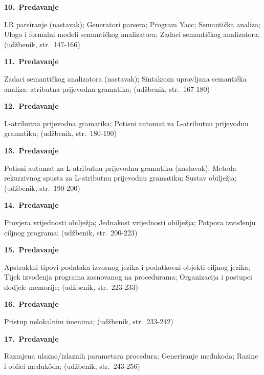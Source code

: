 \documentclass[times, 12pt, utf8]{book}
\newenvironment{myindentpar}[1]%
{\begin{list}{}%
         {\setlength{\leftmargin}{#1}}%
         \item[]%
}
{\end{list}}
\begin{document}
\textbf{10.~Predavanje}
\begin{myindentpar}{30pt}
LR parsiranje (nastavak); Generatori parsera; Program Yacc; Semantička analiza; Uloga i formalni modeli semantičkog analizatora; Zadaci semantičkog analizatora; (udžbenik, str.~147-166) 
\end{myindentpar}

\textbf{11.~Predavanje}
\begin{myindentpar}{30pt}
Zadaci semantičkog analizatora (nastavak); Sintaksom upravljana semantička analiza: atributna prijevodna gramatika; (udžbenik, str.~167-180)
\end{myindentpar}

\textbf{12.~Predavanje}
\begin{myindentpar}{30pt}
L-atributna prijevodna gramatika; Potisni automat za L-atributnu prijevodnu gramatiku; (udžbenik, str.~180-190)
\end{myindentpar}

\textbf{13.~Predavanje}
\begin{myindentpar}{30pt}
Potisni automat za L-atributnu prijevodnu gramatiku (nastavak); Metoda rekurzivnog spusta za L-atributnu prijevodnu gramatiku; Sustav obilježja; (udžbenik, str.~190-200) 
\end{myindentpar}

\textbf{14.~Predavanje}
\begin{myindentpar}{30pt}
Provjera vrijednosti obilježja; Jednakost vrijednosti obilježja; Potpora izvođenju ciljnog programa; (udžbenik, str.~200-223)
\end{myindentpar}

\textbf{15.~Predavanje}
\begin{myindentpar}{30pt}
Apstraktni tipovi podataka izvornog jezika i podatkovni objekti ciljnog jezika; Tijek izvođenja programa zasnovanog na procedurama; Organizacija i postupci dodjele memorije; (udžbenik, str.~223-233) 
\end{myindentpar}

\textbf{16.~Predavanje}
\begin{myindentpar}{30pt}
Pristup nelokalnim imenima; (udžbenik, str.~233-242)
\end{myindentpar}

\textbf{17.~Predavanje}
\begin{myindentpar}{30pt}
Razmjena ulazno/izlaznih parametara procedura; Generiranje međukoda; Razine i oblici međukôda; (udžbenik, str.~243-256) 
\end{myindentpar}
\end{document}
